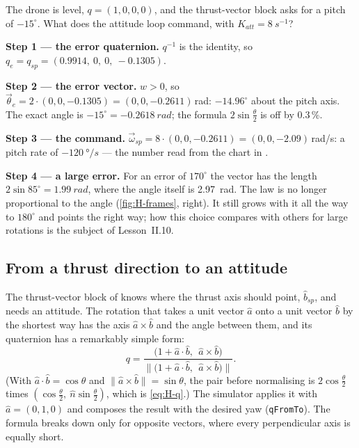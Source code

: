 \begin{example}
\label{ex:H-error}
The drone is level, $q = (1, 0, 0, 0)$, and the thrust-vector block asks for a pitch of $-15^\circ$. What does the attitude loop command, with $K_{att} = \SI{8}{s^{-1}}$?

\textbf{Step 1 — the error quaternion.} $q^{-1}$ is the identity, so $q_e = q_{sp} = (0.9914,\ 0,\ 0,\ -0.1305)$.

\textbf{Step 2 — the error vector.} $w > 0$, so $\vec\theta_e = 2 \cdot (0, 0, -0.1305) = (0, 0, -0.2611)$\,rad: $-14.96^\circ$ about the pitch axis. The exact angle is $-15^\circ = \SI{-0.2618}{rad}$; the formula $2\sin\tfrac\theta2$ is off by 0.3\,\%.

\textbf{Step 3 — the command.} $\vec\omega_{sp} = 8 \cdot (0, 0, -0.2611) = (0, 0, -2.09)$\,rad/s: a pitch rate of $\SI{-120}{\degree/s}$ — the number read from the chart in .

\textbf{Step 4 — a large error.} For an error of $170^\circ$ the vector has the length $2\sin 85^\circ = \SI{1.99}{rad}$, where the angle itself is \SI{2.97}{rad}. The law is no longer proportional to the angle (\cref{fig:H-frames}, right). It still grows with it all the way to $180^\circ$ and points the right way; how this choice compares with others for large rotations is the subject of Lesson~II.10.
\end{example}

\subsection{From a thrust direction to an attitude}
The thrust-vector block of  knows where the thrust axis should point, $\hat b_{sp}$, and needs an attitude. The rotation that takes a unit vector $\hat a$ onto a unit vector $\hat b$ by the shortest way has the axis $\hat a \times \hat b$ and the angle between them, and its quaternion has a remarkably simple form:
\begin{equation}\label{eq:H-fromto}
  q = \frac{\big(1 + \hat a \cdot \hat b,\ \ \hat a \times \hat b\big)}{\big\|\big(1 + \hat a \cdot \hat b,\ \ \hat a \times \hat b\big)\big\|} .
\end{equation}
(With $\hat a \cdot \hat b = \cos\theta$ and $\|\hat a \times \hat b\| = \sin\theta$, the pair before normalising is $2\cos\tfrac\theta2$ times $(\cos\tfrac\theta2,\ \hat n\sin\tfrac\theta2)$, which is \cref{eq:H-q}.) The simulator applies it with $\hat a = (0, 1, 0)$ and composes the result with the desired yaw (\texttt{qFromTo}). The formula breaks down only for opposite vectors, where every perpendicular axis is equally short.

